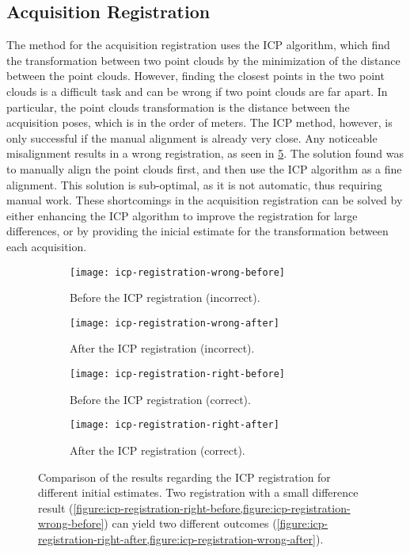 \subsection{Acquisition Registration}

The method for the acquisition registration uses the ICP algorithm, which find the transformation between two point clouds by the minimization of the distance between the point clouds. However, finding the closest points in the two point clouds is a difficult task and can be wrong if two point clouds are far apart. In particular, the point clouds transformation is the distance between the acquisition poses, which is in the order of meters. The ICP method, however, is only successful if the manual alignment is already very close. Any noticeable misalignment results in a wrong registration, as seen in \cref{figure:icp-results}. The solution found was to manually align the point clouds first, and then use the ICP algorithm as a fine alignment. This solution is sub-optimal, as it is not automatic, thus requiring manual work. These shortcomings in the acquisition registration can be solved by either enhancing the ICP algorithm to improve the registration for large differences, or by providing the inicial estimate for the transformation between each acquisition.

\begin{figure}[h]
    
    \centering
    \begin{subfigure}[t]{0.5\textwidth}
        \texttt{[image: icp-registration-wrong-before]}
        \caption{Before the ICP registration (incorrect).}
        \label{figure:icp-registration-wrong-before}
    \end{subfigure}%
    \begin{subfigure}[t]{0.5\textwidth}
        \texttt{[image: icp-registration-wrong-after]}
        \caption{After the ICP registration (incorrect).}
        \label{figure:icp-registration-wrong-after}
    \end{subfigure}

    \begin{subfigure}[t]{0.5\textwidth}
        \texttt{[image: icp-registration-right-before]}
        \caption{Before the ICP registration (correct).}
        \label{figure:icp-registration-right-before}
    \end{subfigure}%
    \begin{subfigure}[t]{0.5\textwidth}
        \texttt{[image: icp-registration-right-after]}
        \caption{After the ICP registration (correct).}
        \label{figure:icp-registration-right-after}
    \end{subfigure}

    \caption{Comparison of the results regarding the ICP registration for different initial estimates. Two registration with a small difference result (\cref{figure:icp-registration-right-before,figure:icp-registration-wrong-before}) can yield two different outcomes (\cref{figure:icp-registration-right-after,figure:icp-registration-wrong-after}).}
    \label{figure:icp-results}

\end{figure}

